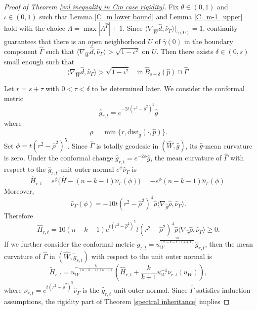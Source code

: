 \documentclass[11pt]{amsart}
\theoremstyle{definition}
\theoremstyle{remark}
\numberwithin{equation}{section}
\begin{document}
\begin{proof}[Proof of Theorem \ref{vol inequality in Cm case rigidity}]
        Fix $\theta\in(0,1)$ and $\iota\in(0,1)$ such that Lemma \ref{C_m lower bound} and Lemma
          \ref{C_m-1_upper} hold with the choice $\Lambda = \max |A^{\hat{\Gamma}}|+1$. Since
          $\langle\nabla_{\hat{W}}\hat{d},\hat{\nu}_{\Gamma}\rangle|_{\hat{\gamma}(0)} =1$,
          continuity guarantees that there is an open neighborhood $U$ of $\hat{\gamma}(0)$ in the
          boundary component $\hat{\Gamma}$ such that
          $\langle\nabla_{\hat{W}}\hat{d},\hat{\nu}_{\Gamma}\rangle>\sqrt{1-\iota^2}$ on
          $U$. Then there exists $\delta\in(0,s)$ small enough such that
        \[
        \langle\nabla_{\hat{W}}\hat{d},\hat{\nu}_{\Gamma}\rangle>\sqrt{1-\iota^2}
          \quad\text{in}\  \hat{B}_{s+\delta}(\hat{p})\cap \hat{\Gamma}.
        \]
        
        Let $r=s+\tau$ with $0<\tau<\delta$ to be determined later. We consider the conformal metric
        \[
            \hat{g}_{r,t}=e^{-2t(r^2-\hat{\rho}^2)^5}\hat{g}
        \]
        where 
        \[
            \hat{\rho}=\min\{r,\text{dist}_{\hat{g}}(\cdot,\hat{p})\}.
        \]
        Set $\phi=t(r^2-\hat{\rho}^2)^5$. Since $\hat{\Gamma}$ is totally geodesic in
          $(\hat{W},\hat g)$, its $\hat g$-mean curvature is zero. Under the conformal change
          $\hat g_{r,t}=e^{-2\phi}\hat g$, the mean curvature of $\hat{\Gamma}$ with respect
          to the $\hat g_{r,t}$-unit outer normal $e^\phi\hat\nu_{\Gamma}$ is
        \[
            \hat H_{r,t}=e^\phi\big(\hat H-(n-k-1)\hat\nu_{\Gamma}(\phi)\big)
              =-e^\phi(n-k-1)\hat\nu_{\Gamma}(\phi).
        \]
        Moreover,
        \[
            \hat\nu_{\Gamma}(\phi)
            =-10t(r^2-\hat\rho^2)^4\hat\rho
              \langle\nabla_{\hat g}\hat\rho,\hat\nu_{\Gamma}\rangle.
        \]
        Therefore
        \[
            \hat{H}_{r,t}
            =10(n-k-1)e^{t(r^2-\hat{\rho}^2)^5}t(r^2-\hat{\rho}^2)^{4}\hat{\rho}
              \langle\nabla_{\hat{g}}\hat{\rho},\hat{\nu}_{\Gamma}\rangle \geq0.
        \]
        If we further consider the conformal metric
          $\tilde{g}_{r,t}=u_{W}^{\frac{2k}{(n-k-1)(k+1)}}\hat{g}_{r,t}$, then the mean curvature
          of $\hat{\Gamma}$ in $(\hat{W},\tilde{g}_{r,t})$ with respect to the unit
          outer normal is
        \[
            \tilde{H}_{r,t}
            =u_{W}^{-\frac{k}{(n-k-1)(k+1)}}
              \left(\hat{H}_{r,t}+\frac{k}{k+1}u_W^{-1}\nu_{r,t}(u_W)\right),
        \]
        where $\nu_{r,t}=e^{t(r^2-\hat\rho^2)^5}\hat\nu_{\Gamma}$ is the $\hat g_{r,t}$-unit outer
          normal. Since $\hat{\Gamma}$ satisfies induction assumptions, the rigidity part of Theorem \ref{spectral inheritance} implies

\end{proof}
\end{document}
